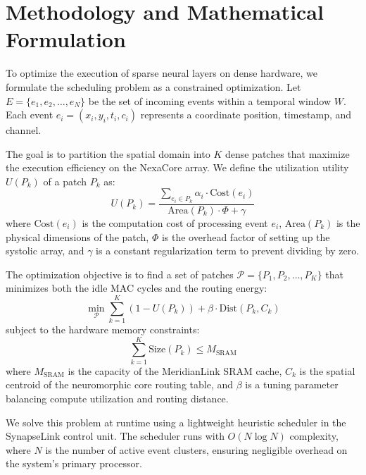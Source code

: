 \section{Methodology and Mathematical Formulation}
\label{sec:methodology}

To optimize the execution of sparse neural layers on dense hardware, we formulate the scheduling problem as a constrained optimization. Let $E = \{e_1, e_2, \dots, e_N\}$ be the set of incoming events within a temporal window $W$. Each event $e_i = (x_i, y_i, t_i, c_i)$ represents a coordinate position, timestamp, and channel.

The goal is to partition the spatial domain into $K$ dense patches that maximize the execution efficiency on the NexaCore array. We define the utilization utility $U(P_k)$ of a patch $P_k$ as:
\begin{equation}
U(P_k) = \frac{\sum_{e_i \in P_k} \alpha_i \cdot \text{Cost}(e_i)}{\text{Area}(P_k) \cdot \Phi + \gamma}
\label{eq:utility}
\end{equation}
where $\text{Cost}(e_i)$ is the computation cost of processing event $e_i$, $\text{Area}(P_k)$ is the physical dimensions of the patch, $\Phi$ is the overhead factor of setting up the systolic array, and $\gamma$ is a constant regularization term to prevent dividing by zero.

The optimization objective is to find a set of patches $\mathcal{P} = \{P_1, P_2, \dots, P_K\}$ that minimizes both the idle MAC cycles and the routing energy:
\begin{equation}
\min_{\mathcal{P}} \sum_{k=1}^K \left( 1 - U(P_k) \right) + \beta \cdot \text{Dist}(P_k, C_k)
\label{eq:objective}
\end{equation}
subject to the hardware memory constraints:
\begin{equation}
\sum_{k=1}^K \text{Size}(P_k) \le M_{\text{SRAM}}
\end{equation}
where $M_{\text{SRAM}}$ is the capacity of the MeridianLink SRAM cache, $C_k$ is the spatial centroid of the neuromorphic core routing table, and $\beta$ is a tuning parameter balancing compute utilization and routing distance.

We solve this problem at runtime using a lightweight heuristic scheduler in the SynapseLink control unit. The scheduler runs with $O(N \log N)$ complexity, where $N$ is the number of active event clusters, ensuring negligible overhead on the system's primary processor.
